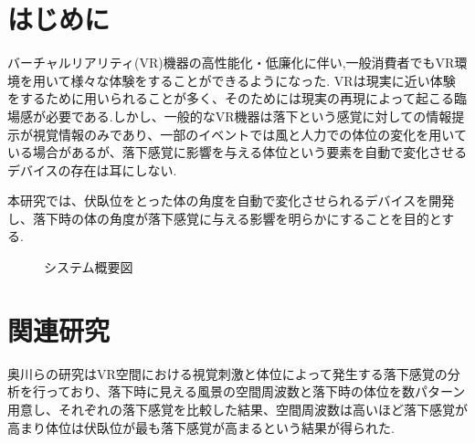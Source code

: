 \documentclass[uplatex]{jsarticle}
\begin{document}
\vspace{3mm}

\setcounter{page}{9}

\section{はじめに}

 
バーチャルリアリティ(VR)機器の高性能化・低廉化に伴い,一般消費者でもVR環境を用いて様々な体験をすることができるようになった.
VRは現実に近い体験をするために用いられることが多く、そのためには現実の再現によって起こる臨場感が必要である.しかし、一般的なVR機器は落下という感覚に対しての情報提示が視覚情報のみであり、一部のイベントでは風と人力での体位の変化を用いている場合があるが、落下感覚に影響を与える体位という要素を自動で変化させるデバイスの存在は耳にしない.

本研究では、伏臥位をとった体の角度を自動で変化させられるデバイスを開発し、落下時の体の角度が落下感覚に与える影響を明らかにすることを目的とする.

\begin{figure}[tb]
  \centering
  \caption{システム概要図}
  \label{fig:about_system}

\end{figure}

\section{関連研究}
奥川らの研究\cite{spatial_stimulation_effect_falling}はVR空間における視覚刺激と体位によって発生する落下感覚の分析を行っており、落下時に見える風景の空間周波数と落下時の体位を数パターン用意し、それぞれの落下感覚を比較した結果、空間周波数は高いほど落下感覚が高まり体位は伏臥位が最も落下感覚が高まるという結果が得られた.
\end{document}
